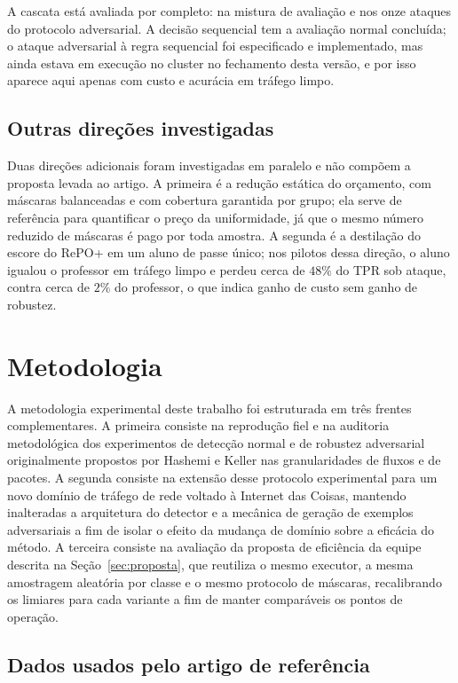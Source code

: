 \documentclass[conference]{IEEEtran}
\begin{document}
A cascata está avaliada por completo: na mistura de avaliação e nos onze ataques do protocolo adversarial.
A decisão sequencial tem a avaliação normal concluída; o ataque adversarial à regra sequencial foi especificado e implementado, mas ainda estava em execução no cluster no fechamento desta versão, e por isso aparece aqui apenas com custo e acurácia em tráfego limpo.

\subsection{Outras direções investigadas}

Duas direções adicionais foram investigadas em paralelo e não compõem a proposta levada ao artigo.
A primeira é a redução estática do orçamento, com máscaras balanceadas e com cobertura garantida por grupo; ela serve de referência para quantificar o preço da uniformidade, já que o mesmo número reduzido de máscaras é pago por toda amostra.
A segunda é a destilação do escore do RePO+ em um aluno de passe único; nos pilotos dessa direção, o aluno igualou o professor em tráfego limpo e perdeu cerca de $48\%$ do TPR sob ataque, contra cerca de $2\%$ do professor, o que indica ganho de custo sem ganho de robustez.


\section{Metodologia}\label{sec:metodologia}

A metodologia experimental deste trabalho foi estruturada em três frentes complementares.
A primeira consiste na reprodução fiel e na auditoria metodológica dos experimentos de detecção normal e de robustez adversarial originalmente propostos por Hashemi e Keller \cite{hashemi2020} nas granularidades de fluxos e de pacotes.
A segunda consiste na extensão desse protocolo experimental para um novo domínio de tráfego de rede voltado à Internet das Coisas, mantendo inalteradas a arquitetura do detector e a mecânica de geração de exemplos adversariais a fim de isolar o efeito da mudança de domínio sobre a eficácia do método.
A terceira consiste na avaliação da proposta de eficiência da equipe descrita na Seção~\ref{sec:proposta}, que reutiliza o mesmo executor, a mesma amostragem aleatória por classe e o mesmo protocolo de máscaras, recalibrando os limiares para cada variante a fim de manter comparáveis os pontos de operação.

\subsection{Dados usados pelo artigo de referência}
\end{document}
